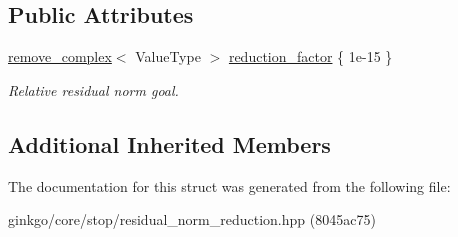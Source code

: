 \subsection*{Public Attributes}
\begin{DoxyCompactItemize}
\item 
\mbox{\label{structgko_1_1stop_1_1ResidualNormReduction_1_1parameters__type_a488ffd39d7ea7fc9093a0e7604be2746}} 
\hyperlink{namespacegko_adfcb75c44f6b6c701989419c166f6e7e}{remove\+\_\+complex}$<$ Value\+Type $>$ \hyperlink{structgko_1_1stop_1_1ResidualNormReduction_1_1parameters__type_a488ffd39d7ea7fc9093a0e7604be2746}{reduction\+\_\+factor} \{ 1e-\/15 \}
\begin{DoxyCompactList}\small\item\em Relative residual norm goal. \end{DoxyCompactList}\end{DoxyCompactItemize}
\subsection*{Additional Inherited Members}


The documentation for this struct was generated from the following file\+:\begin{DoxyCompactItemize}
\item 
ginkgo/core/stop/residual\+\_\+norm\+\_\+reduction.\+hpp (8045ac75)\end{DoxyCompactItemize}
